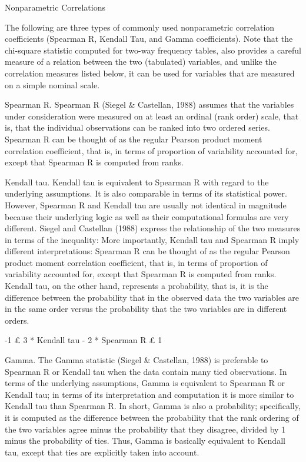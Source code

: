 Nonparametric Correlations

The following are three types of commonly used nonparametric correlation coefficients (Spearman R, Kendall Tau, and Gamma coefficients). Note that the chi-square statistic computed for two-way frequency tables, also provides a careful measure of a relation between the two (tabulated) variables, and unlike the correlation measures listed below, it can be used for variables that are measured on a simple nominal scale.

Spearman R. Spearman R (Siegel & Castellan, 1988) assumes that the variables under consideration were measured on at least an ordinal (rank order) scale, that is, that the individual observations can be ranked into two ordered series. Spearman R can be thought of as the regular Pearson product moment correlation coefficient, that is, in terms of proportion of variability accounted for, except that Spearman R is computed from ranks.

Kendall tau. Kendall tau is equivalent to Spearman R with regard to the underlying assumptions. It is also comparable in terms of its statistical power. However, Spearman R and Kendall tau are usually not identical in magnitude because their underlying logic as well as their computational formulas are very different. Siegel and Castellan (1988) express the relationship of the two measures in terms of the inequality: More importantly, Kendall tau and Spearman R imply different interpretations: Spearman R can be thought of as the regular Pearson product moment correlation coefficient, that is, in terms of proportion of variability accounted for, except that Spearman R is computed from ranks. Kendall tau, on the other hand, represents a probability, that is, it is the difference between the probability that in the observed data the two variables are in the same order versus the probability that the two variables are in different orders.

-1 £ 3 * Kendall tau - 2 * Spearman R £ 1

Gamma. The Gamma statistic (Siegel & Castellan, 1988) is preferable to Spearman R or Kendall tau when the data contain many tied observations. In terms of the underlying assumptions, Gamma is equivalent to Spearman R or Kendall tau; in terms of its interpretation and computation it is more similar to Kendall tau than Spearman R. In short, Gamma is also a probability; specifically, it is computed as the difference between the probability that the rank ordering of the two variables agree minus the probability that they disagree, divided by 1 minus the probability of ties. Thus, Gamma is basically equivalent to Kendall tau, except that ties are explicitly taken into account.
